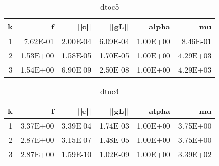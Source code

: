 \documentclass[12pt]{article}
\begin{document}
\pagebreak
\begin{table}[htbp]
  \centering
  \caption{dtoc5}
    \begin{tabular}{rrrrrr}
    \toprule
    k     & f     & ||c|| & ||gL||   & alpha & mu \\
    \midrule
    1     & 7.62E-01 & 2.00E-04 & 6.09E-04 & 1.00E+00 & 8.46E-01 \\
    2     & 1.53E+00 & 1.58E-05 & 1.70E-05 & 1.00E+00 & 4.29E+03 \\
    3     & 1.54E+00 & 6.90E-09 & 2.50E-08 & 1.00E+00 & 4.29E+03 \\
    \bottomrule
    \end{tabular}%
  \label{tab:addlabel}%
\end{table}%

\pagebreak
\begin{table}[htbp]
  \centering
  \caption{dtoc4}
    \begin{tabular}{rrrrrr}
    \toprule
    k     & f     & ||c|| & ||gL||   & alpha & mu \\
    \midrule
    1     & 3.37E+00 & 3.39E-04 & 1.74E-03 & 1.00E+00 & 3.75E+00 \\
    2     & 2.87E+00 & 3.15E-07 & 1.48E-05 & 1.00E+00 & 3.75E+00 \\
    3     & 2.87E+00 & 1.59E-10 & 1.02E-09 & 1.00E+00 & 3.39E+02 \\
    \bottomrule
    \end{tabular}%
  \label{tab:addlabel}%
\end{table}%
\end{document}
